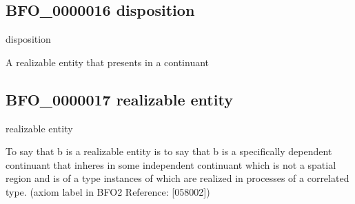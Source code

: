 \documentclass[letterpaper,10pt,english]{sphinxmanual}
\begin{document}
\subsection{BFO\_0000016 \sphinxhyphen{} disposition}
\label{\detokenize{doc-BFO_0000016:bfo-0000016-disposition}}\label{\detokenize{doc-BFO_0000016:index-0}}\label{\detokenize{doc-BFO_0000016::doc}}
\begin{sphinxShadowBox}

\sphinxAtStartPar
disposition
\end{sphinxShadowBox}

\begin{sphinxShadowBox}

\sphinxAtStartPar
A realizable entity that presents in a continuant
\end{sphinxShadowBox}

\begin{sphinxShadowBox}

\sphinxAtStartPar
{}
\end{sphinxShadowBox}
\begin{quote}

\ignorespaces \end{quote}


\subsection{BFO\_0000017 \sphinxhyphen{} realizable entity}
\label{\detokenize{doc-BFO_0000017:bfo-0000017-realizable-entity}}\label{\detokenize{doc-BFO_0000017:index-0}}\label{\detokenize{doc-BFO_0000017::doc}}
\begin{sphinxShadowBox}

\sphinxAtStartPar
realizable entity
\end{sphinxShadowBox}

\begin{sphinxShadowBox}

\sphinxAtStartPar
To say that b is a realizable entity is to say that b is a specifically dependent continuant that inheres in some independent continuant which is not a spatial region and is of a type instances of which are realized in processes of a correlated type. (axiom label in BFO2 Reference: {[}058\sphinxhyphen{}002{]})
\end{sphinxShadowBox}
\end{document}
